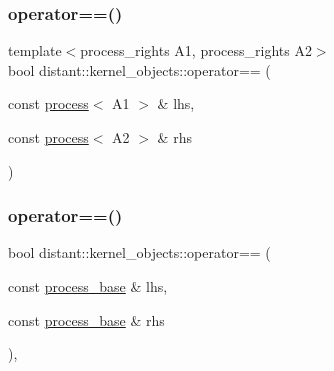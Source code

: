 \subsubsection{\texorpdfstring{operator==()}{operator==()}\hspace{0.1cm}{\footnotesize\ttfamily [2/3]}}
{\footnotesize\ttfamily template$<$process\+\_\+rights A1, process\+\_\+rights A2$>$ \\
bool distant\+::kernel\+\_\+objects\+::operator== (\begin{DoxyParamCaption}\item[{const \mbox{\hyperlink{classdistant_1_1kernel__objects_1_1process}{process}}$<$ A1 $>$ \&}]{lhs,  }\item[{const \mbox{\hyperlink{classdistant_1_1kernel__objects_1_1process}{process}}$<$ A2 $>$ \&}]{rhs }\end{DoxyParamCaption})\hspace{0.3cm}{\ttfamily [noexcept]}}

\mbox{\label{namespacedistant_1_1kernel__objects_adcdcd364a4d3ab5561ce31824df94ca9}} 
\subsubsection{\texorpdfstring{operator==()}{operator==()}\hspace{0.1cm}{\footnotesize\ttfamily [3/3]}}
{\footnotesize\ttfamily bool distant\+::kernel\+\_\+objects\+::operator== (\begin{DoxyParamCaption}\item[{const \mbox{\hyperlink{classdistant_1_1kernel__objects_1_1process__base}{process\+\_\+base}} \&}]{lhs,  }\item[{const \mbox{\hyperlink{classdistant_1_1kernel__objects_1_1process__base}{process\+\_\+base}} \&}]{rhs }\end{DoxyParamCaption})\hspace{0.3cm}{\ttfamily [inline]}, {\ttfamily [noexcept]}}

